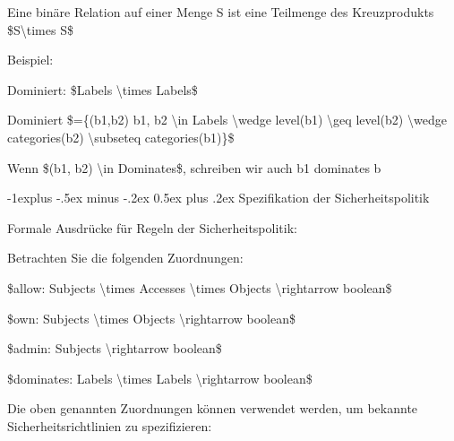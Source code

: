\documentclass[a4paper]{article}
\makeatletter
\renewcommand{\subsection}{\@startsection{subsection}{2}{0mm}%
 {-1explus -.5ex minus -.2ex}%
 {0.5ex plus .2ex}%
 {\normalfont\normalsize\bfseries}}
\makeatother
\begin{document}
\begin{multicols}{3}
\begin{itemize*}
            \begin{itemize*}
                  \item Eine binäre Relation auf einer Menge S ist eine Teilmenge des Kreuzprodukts \$S\textbackslash times S\$
                  \item Beispiel:
                  \begin{itemize*} \item Dominiert: \$Labels \textbackslash times Labels\$ \item Dominiert \$=\{(b1,b2) \textbar{} b1, b2 \textbackslash in Labels \textbackslash wedge level(b1) \textbackslash geq level(b2) \textbackslash wedge categories(b2) \textbackslash subseteq categories(b1)\}\$ \item Wenn \$(b1, b2) \textbackslash in Dominates\$, schreiben wir auch b1 dominates b \end{itemize*}
            \end{itemize*}
      \end{itemize*}


      \subsection{Spezifikation der
            Sicherheitspolitik}

      \begin{itemize*}
            \item
            Formale Ausdrücke für Regeln der Sicherheitspolitik:
            \item
            Betrachten Sie die folgenden Zuordnungen:

            \begin{itemize*}
                  \item \$allow: Subjects \textbackslash times Accesses \textbackslash times Objects \textbackslash rightarrow boolean\$
                  \item \$own: Subjects \textbackslash times Objects \textbackslash rightarrow boolean\$
                  \item \$admin: Subjects \textbackslash rightarrow boolean\$
                  \item \$dominates: Labels \textbackslash times Labels \textbackslash rightarrow boolean\$
            \end{itemize*}
            \item
            Die oben genannten Zuordnungen können verwendet werden, um bekannte
            Sicherheitsrichtlinien zu spezifizieren:


\end{itemize*}
\end{multicols}
\end{document}
